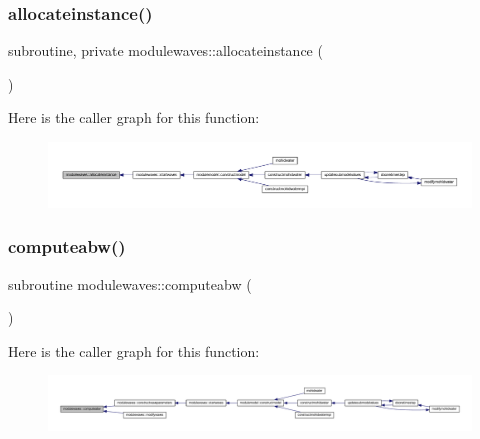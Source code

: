 \subsubsection{\texorpdfstring{allocateinstance()}{allocateinstance()}}
{\footnotesize\ttfamily subroutine, private modulewaves\+::allocateinstance (\begin{DoxyParamCaption}{ }\end{DoxyParamCaption})\hspace{0.3cm}{\ttfamily [private]}}

Here is the caller graph for this function\+:\nopagebreak
\begin{figure}[H]
\begin{center}
\leavevmode
\includegraphics[width=350pt]{namespacemodulewaves_a297c227bd5b05df6253e23b3cba4aaca_icgraph}
\end{center}
\end{figure}
\mbox{\label{namespacemodulewaves_a3aa2de7449377be15fcc0bbb463170ed}} 
\subsubsection{\texorpdfstring{computeabw()}{computeabw()}}
{\footnotesize\ttfamily subroutine modulewaves\+::computeabw (\begin{DoxyParamCaption}{ }\end{DoxyParamCaption})\hspace{0.3cm}{\ttfamily [private]}}

Here is the caller graph for this function\+:\nopagebreak
\begin{figure}[H]
\begin{center}
\leavevmode
\includegraphics[width=350pt]{namespacemodulewaves_a3aa2de7449377be15fcc0bbb463170ed_icgraph}
\end{center}
\end{figure}
\mbox{\label{namespacemodulewaves_a87b9e4a4fb336f9ea383004f7732a8e5}} 

